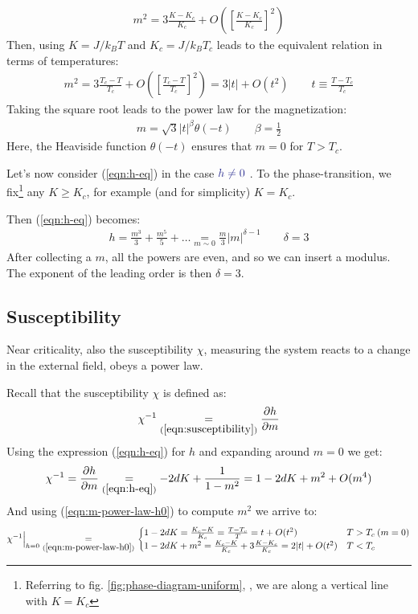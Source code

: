 \documentclass[../../main.tex]{subfiles}
\begin{document}
\begin{align*}
    m^2 = 3 \frac{K-K_c}{K_c} + O\left(\left[\frac{K-K_c}{K_c} \right]^2\right) 
\end{align*}
Then, using $K=J/k_B T$ and $K_c = J/k_B T_c$ leads to the equivalent relation in terms of temperatures:
\begin{align*}
    m^2 = 3 \frac{T_c - T}{T_c} + O\left(\left[\frac{T_c - T}{T_c} \right]^2\right)  = 3 |t| + O(t^2) \qquad t \equiv \frac{T-T_c}{T_c} 
\end{align*} 
Taking the square root leads to the power law for the magnetization:
\begin{align}\label{eqn:m-power-law-h0}
    m = \sqrt{3} |t|^\beta \theta(-t) \qquad \beta = \frac{1}{2} 
\end{align}
Here, the Heaviside function $\theta(-t)$ ensures that $m=0$ for $T > T_c$.

\medskip

Let's now consider (\ref{eqn:h-eq}) in the case $\textcolor{Blue}{h \neq 0}$ . To  the phase-transition, we fix\footnote{Referring to fig. \ref{fig:phase-diagram-uniform}, \pageref{fig:phase-diagram-uniform}, we are  along a vertical line with $K = K_c$} any $K \geq K_c$, for example (and for simplicity) $K=K_c$. 

Then (\ref{eqn:h-eq}) becomes:
\begin{align}\label{eqn:m-power-law-h}
    h = \frac{m^3}{3} + \frac{m^5}{5} + \dots \underset{m\sim 0}{=} \frac{m}{3} |m|^{\delta - 1} \qquad \delta=3
\end{align}
After collecting a $m$, all the powers are even, and so we can insert a modulus. The exponent of the leading order is then $\delta=3$.

\subsection{Susceptibility}
Near criticality, also the susceptibility $\chi$, measuring  the system reacts to a change in the external field, obeys a power law.

\medskip

Recall that the susceptibility $\chi$ is defined as:
\begin{align*}
    \chi^{-1} \underset{(\ref{eqn:susceptibility})}{=} \pdv{h}{m}   
\end{align*}
Using the expression (\ref{eqn:h-eq}) for $h$ and expanding around $m = 0$ we get:
\begin{align*}
    \chi^{-1} = \pdv{h}{m} \underset{(\ref{eqn:h-eq})}{=}  -2dK + \frac{1}{1-m^2}  = 1 - 2dK + m^2 + O(m^4)
\end{align*}
And using (\ref{eqn:m-power-law-h0}) to compute $m^2$ we arrive to:
\begin{align*}
    \chi^{-1} \Big|_{h=0} \underset{(\ref{eqn:m-power-law-h0})}{=} \begin{cases}
        1 - 2 d K = \frac{K_c-K}{K_c} = \frac{T-T_c}{T} = t+ O(t^2) & T > T_c \> (m=0)\\  
        1 - 2 dK + m^2 = \frac{K_c-K}{K_c} + 3\frac{K-K_c}{K_c} = 2|t| + O(t^2) & T<T_c 
    \end{cases}
\end{align*}
\end{document}
